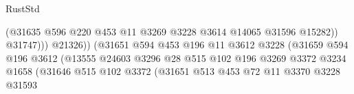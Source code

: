\begin{lexlean}{RustStd}
\begin{coremodule}
                                                      (@31635
                                                        @596
                                                        @220
                                                        @453
                                                        @11
                                                        @3269
                                                        @3228
                                                        @3614
                                                        @14065
                                                        @31596
                                                        @15282))
                                                    @31747)))
                                              @21326))
                                          (@31651
                                            @594
                                            @453
                                            @196
                                            @11
                                            @3612
                                            @3228
                                            (@31659
                                              @594
                                              @196
                                              @3612
                                              (@13555
                                                @24603
                                                @3296
                                                @28
                                                @515
                                                @102
                                                @196
                                                @3269
                                                @3372
                                                @3234
                                                @1658
                                                (@31646
                                                  @515
                                                  @102
                                                  @3372
                                                  (@31651
                                                    @513
                                                    @453
                                                    @72
                                                    @11
                                                    @3370
                                                    @3228
                                                    @31593

\end{coremodule}
\end{lexlean}
